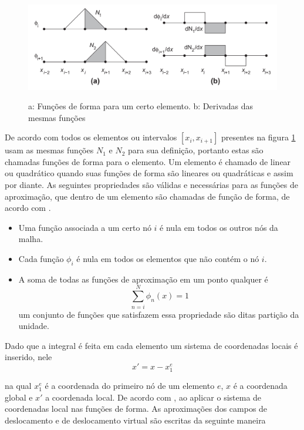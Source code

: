 \begin{figure}
    \centering
    \caption{a: Funções de forma para um certo elemento. b: Derivadas das mesmas funções}
    \includegraphics[width=0.8\linewidth]{images/funcformaverdade.png}
    \label{fig:funcformverd}
\end{figure}

De acordo com \cite{zienkiewicz2013} todos os elementos ou intervalos $ [x_i, x_{i+1}] $ presentes na figura \ref{fig:funcformverd} usam as mesmas funções $ N_1 $  e $ N_2 $ para sua definição, portanto estas são chamadas funções de forma para o elemento. Um elemento é chamado de linear ou quadrático quando suas funções de forma são lineares ou quadráticas e assim por diante. As seguintes propriedades são válidas e necessárias para as funções de aproximação, que dentro de um elemento são chamadas de função de forma, de acordo com \cite{Paulo}.

\begin{itemize}
    \item Uma função associada a um certo nó $ i $ é nula em todos os outros nós da malha.
    \item Cada função $ \phi_i $ é nula em todos os elementos que não contém o nó $i$.
    \item A soma de todas as funções de aproximação em um ponto qualquer é \begin{equation}
        \sum^N_{n=i} \phi_n (x) = 1
    \end{equation} um conjunto de funções que satisfazem essa propriedade são ditas partição da unidade. 
\end{itemize}

Dado que a integral é feita em cada elemento  um sistema de coordenadas locais é inserido, nele
\begin{equation}
    x' =  x - x^e_1 
\end{equation}

na qual $ x^e_1 $ é a coordenada do primeiro nó de um elemento $e $, $x$ é a coordenada global e $x'$ a coordenada local. De acordo com \cite{zienkiewicz2013}, ao aplicar o sistema de coordenadas local nas funções de forma. As aproximações dos campos de deslocamento e de deslocamento virtual são escritas da seguinte maneira

